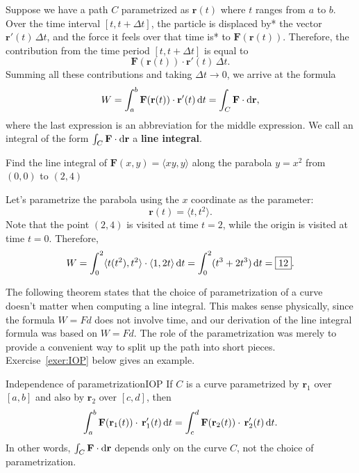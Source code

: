 \documentclass[svgnames]{watsonbook}
\begin{document}
Suppose we have a path $C$ parametrized as $\mathbf{r}(t)$ where $t$
ranges from $a$ to $b$. Over the time interval $[t,t+\Delta t]$, the
particle is displaced by* the vector $\mathbf{r}'(t) \, \Delta t$, and
the force it feels over that time is* to $\mathbf{F}(\mathbf{r}(t))$.
Therefore, the contribution from the time period $[t, t+\Delta t]$ is
equal to 
\[
  \mathbf{F}(\mathbf{r}(t)) \cdot \mathbf{r}'(t) \, \Delta t. 
\]
Summing all these contributions and taking $\Delta t \to 0$, we arrive
at the formula
\[
  W = \int_a^b \mathbf{F}(\mathbf{r}(t)) \cdot \mathbf{r}'(t) \, {\mathrm{d}}t =
  \int_C \mathbf{F} \cdot \mathrm{d}\mathbf{r}, 
\]
where the last expression is an abbreviation for the middle
expression. We call an integral of the form $\int_C \mathbf{F} \cdot
\mathrm{d}\mathbf{r}$ a \textbf{line integral}. 

\begin{example}{}{}
  Find the line integral of $\mathbf{F}(x,y) = \langle xy, y \rangle$
  along the parabola $y = x^2$ from 
  $(0,0)$ to $(2,4)$
\end{example}

\begin{solution}
  Let's parametrize the parabola using the $x$ coordinate as the
  parameter:
  \[
    \mathbf{r}(t) = \langle t, t^2 \rangle. 
  \]
  Note that the point $(2,4)$ is visited at time $t=2$, while the
  origin is visited at time $t=0$. Therefore, 
  \[
    W = \int_0^2 \langle t(t^2), t^2 \rangle \cdot \langle 1, 2t \rangle
    \, {\mathrm{d}}t = \int_0^2 (t^3 + 2t^3) \, {\mathrm{d}}t = \boxed{12}. 
  \]
\end{solution}

The following theorem states that the choice of parametrization of a
curve doesn't matter when computing a line integral. This makes sense
physically, since the formula $W = Fd$ does not involve time, and our
derivation of the line integral formula was based on $W=Fd$. The role
of the parametrization was merely to provide a convenient way to split
up the path into short pieces. Exercise~\ref{exer:IOP} below gives an
example.

\begin{theo}{Independence of parametrization}{IOP}
  If $C$ is a curve parametrized by $\mathbf{r}_1$ over $[a,b]$ and
  also by $\mathbf{r}_2$ over $[c,d]$, then
  \[
    \int_a^b\mathbf{F}(\mathbf{r}_1(t))  \cdot \,
    \mathbf{r}'_1(t) \, {\mathrm{d}}t =
    \int_c^d \mathbf{F}(\mathbf{r}_2(t))  \cdot \,
    \mathbf{r}'_2(t) \, {\mathrm{d}}t. 
  \]
  In other words, $\int_C \mathbf{F} \cdot \mathrm{d}\mathbf{r}$ depends only
  on the curve $C$, not the choice of parametrization. 
\end{theo}
\end{document}
